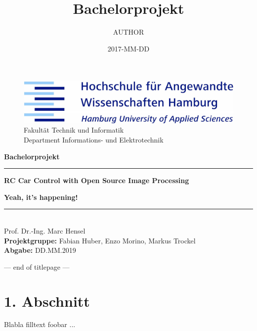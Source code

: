 \documentclass[a4paper,10pt]{article}
\title{Bachelorprojekt}
\date{2017-MM-DD}
\author{AUTHOR}
\begin{document}
\begin{titlepage}
\begin{figure}[h!]
  \begin{flushright}
  \begin{spacing}{1.5}
  \includegraphics[width=.5\linewidth]{images/hawlogo.png}
  \label{fig:hawlogo}\\
  \small Fakultät Technik und Informatik\\
  \small Department Informations- und Elektrotechnik
  \end{spacing}
  \end{flushright}
\end{figure}
\textbf{\large Bachelorprojekt}
\begin{center}\noindent\textcolor{blue(ncs)}{\rule{13.5cm}{0.5mm}}\end{center}
\begin{spacing}{4.5}
\textbf{\huge RC Car Control with Open Source Image Processing}
\end{spacing}
\textbf{\large\indent Yeah, it's happening!}
\begin{center}\noindent\textcolor{blue(ncs)}{\rule{13.5cm}{0.5mm}}\end{center}
\begin{spacing}{1.15}
\vspace*{\fill}
\noindent
\textnormal{\\
  Prof. Dr.-Ing. Marc Hensel \\
  \textbf{Projektgruppe:} Fabian Huber, Enzo Morino, Markus Trockel \\
  \textbf{Abgabe:} DD.MM.2019 \\
}
\end{spacing}
\end{titlepage}
--- end of titlepage ---

  \newpage

  \tableofcontents
  \newpage


  \section{1. Abschnitt}
  Blabla filltext foobar \cite{wikipedia:foobar}... \\
  
\end{document}
